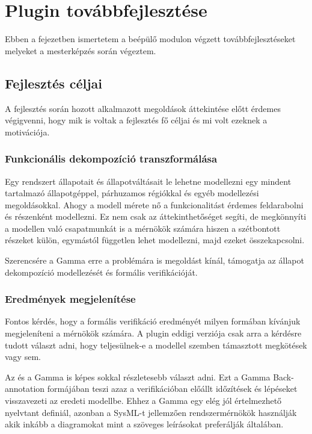 \chapter{Plugin továbbfejlesztése}

Ebben a fejezetben ismertetem a beépülő modulon végzett továbbfejlesztéseket melyeket a mesterképzés során végeztem. 

\section{Fejlesztés céljai}

A fejlesztés során hozott alkalmazott megoldások áttekintése előtt érdemes végigvenni, hogy mik is voltak a fejlesztés fő céljai és mi volt ezeknek a motivációja.

\subsection{Funkcionális dekompozíció transzformálása}
Egy rendszert állapotait és állapotváltásait le lehetne modellezni egy mindent tartalmazó állapotgéppel, párhuzamos régiókkal és egyéb modellezési megoldásokkal. Ahogy a modell mérete nő a funkcionalitást érdemes feldarabolni és részenként modellezni. Ez nem csak az áttekinthetőséget segíti, de megkönnyíti a modellen való csapatmunkát is a mérnökök számára hiszen a szétbontott részeket külön, egymástól független lehet modellezni, majd ezeket összekapcsolni.

Szerencsére a Gamma erre a problémára is megoldást kínál, támogatja az állapot dekompozíció modellezését és formális verifikációját.

\subsection{Eredmények megjelenítése}
Fontos kérdés, hogy a formális verifikáció eredményét milyen formában kívánjuk megjeleníteni a mérnökök számára. A plugin eddigi verziója csak arra a kérdésre tudott választ adni, hogy teljesülnek-e a modellel szemben támasztott megkötések vagy sem.

Az \uppaal és a Gamma is képes sokkal részletesebb választ adni. Ezt a Gamma Back-annotation formájában teszi azaz a verifikációban előállt időzítések és lépéseket visszavezeti az eredeti modellbe. Ehhez a Gamma egy elég jól értelmezhető nyelvtant definiál, azonban a SysML-t jellemzően rendszermérnökök használják akik inkább a diagramokat mint a szöveges leírásokat preferálják általában.

